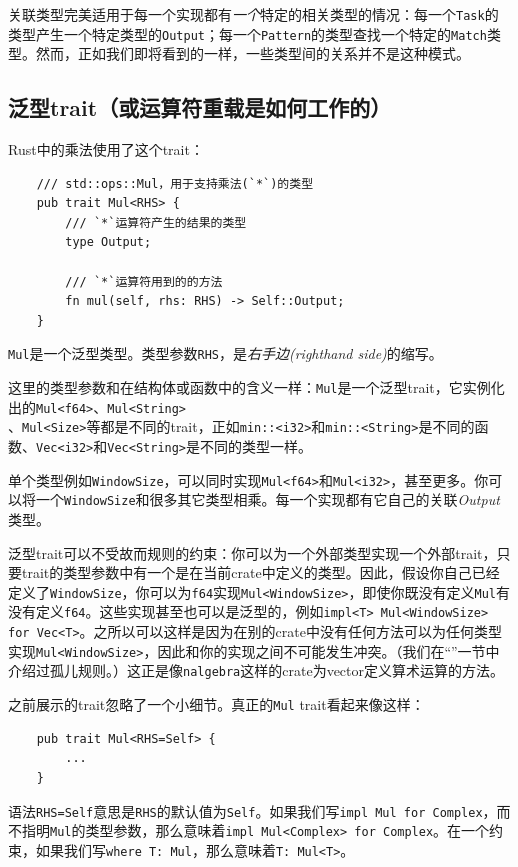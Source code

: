 关联类型完美适用于每一个实现都有\emph{一个}特定的相关类型的情况：每一个\texttt{Task}的类型产生一个特定类型的\texttt{Output}；每一个\texttt{Pattern}的类型查找一个特定的\texttt{Match}类型。然而，正如我们即将看到的一样，一些类型间的关系并不是这种模式。

\subsection{泛型trait（或运算符重载是如何工作的）}
Rust中的乘法使用了这个trait：
\begin{verbatim}
    /// std::ops::Mul，用于支持乘法(`*`)的类型
    pub trait Mul<RHS> {
        /// `*`运算符产生的结果的类型
        type Output;

        /// `*`运算符用到的的方法
        fn mul(self, rhs: RHS) -> Self::Output;
    }
\end{verbatim}

\texttt{Mul}是一个泛型类型。类型参数\texttt{RHS}，是\emph{右手边(righthand side)}的缩写。

这里的类型参数和在结构体或函数中的含义一样：\texttt{Mul}是一个泛型trait，它实例化出的\texttt{Mul<f64>}、\texttt{Mul<String>}\\
、\texttt{Mul<Size>}等都是不同的trait，正如\texttt{min::<i32>}和\texttt{min::<String>}是不同的函数、\texttt{Vec<i32>}和\texttt{Vec<String>}是不同的类型一样。

单个类型例如\texttt{WindowSize}，可以同时实现\texttt{Mul<f64>}和\texttt{Mul<i32>}，甚至更多。你可以将一个\texttt{WindowSize}和很多其它类型相乘。每一个实现都有它自己的关联\emph{Output}类型。

泛型trait可以不受故而规则的约束：你可以为一个外部类型实现一个外部trait，只要trait的类型参数中有一个是在当前crate中定义的类型。因此，假设你自己已经定义了\texttt{WindowSize}，你可以为\texttt{f64}实现\texttt{Mul<WindowSize>}，即使你既没有定义\texttt{Mul}有没有定义\texttt{f64}。这些实现甚至也可以是泛型的，例如\texttt{impl<T> Mul<WindowSize> for Vec<T>}。之所以可以这样是因为在别的crate中没有任何方法可以为任何类型实现\texttt{Mul<WindowSize>}，因此和你的实现之间不可能发生冲突。（我们在“”一节中介绍过孤儿规则。）这正是像\texttt{nalgebra}这样的crate为vector定义算术运算的方法。

之前展示的trait忽略了一个小细节。真正的\texttt{Mul} trait看起来像这样：
\begin{verbatim}
    pub trait Mul<RHS=Self> {
        ...
    }
\end{verbatim}

语法\texttt{RHS=Self}意思是\texttt{RHS}的默认值为\texttt{Self}。如果我们写\texttt{impl Mul for Complex}，而不指明\texttt{Mul}的类型参数，那么意味着\texttt{impl Mul<Complex> for Complex}。在一个约束，如果我们写\texttt{where T: Mul}，那么意味着\texttt{T: Mul<T>}。

